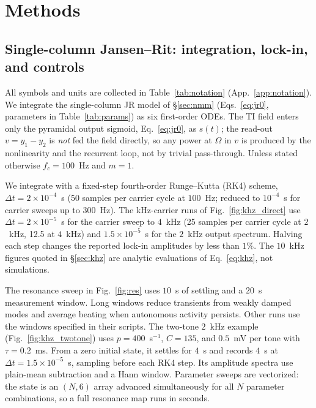 \documentclass[11pt,a4paper]{article}
\begin{document}

\section{Methods}

\subsection{Single-column Jansen--Rit: integration, lock-in, and controls}
All symbols and units are collected in Table~\ref{tab:notation}
(App.~\ref{app:notation}). We integrate the single-column JR model of \S\ref{sec:nmm}
(Eqs.~\eqref{eq:jr0}, parameters in Table~\ref{tab:params}) as six first-order
ODEs. The TI field enters only the pyramidal output sigmoid, Eq.~\eqref{eq:jr0},
as $s(t)$; the read-out $v=y_1-y_2$ is \emph{not} fed the field directly, so any
power at $\Omega$ in $v$ is produced by the nonlinearity and the recurrent loop,
not by trivial pass-through. Unless stated otherwise $f_c=100$~Hz and $m=1$.

We integrate with a fixed-step fourth-order Runge--Kutta (RK4) scheme,
$\Delta t=2\times10^{-4}$~s (50 samples per carrier cycle at $100$~Hz; reduced to
$10^{-4}$~s for carrier sweeps up to $300$~Hz). The kHz-carrier runs of
Fig.~\ref{fig:khz_direct} use $\Delta t=2\times10^{-5}$~s for the carrier sweep to
$4$~kHz (25 samples per carrier cycle at $2$~kHz, 12.5 at $4$~kHz) and
$1.5\times10^{-5}$~s for the $2$~kHz output spectrum. Halving each step changes the
reported lock-in amplitudes by less than $1\%$. The $10$~kHz figures quoted in
\S\ref{sec:khz} are analytic evaluations of Eq.~\eqref{eq:khz}, not simulations.

The resonance sweep in Fig.~\ref{fig:res} uses $10$~s of settling and a $20$~s
measurement window. Long windows reduce transients from weakly damped modes and
average beating when autonomous activity persists. Other runs use the windows
specified in their scripts.
The two-tone $2$~kHz example (Fig.~\ref{fig:khz_twotone}) uses $p=400$~s$^{-1}$,
$C=135$, and $0.5$~mV per tone with $\tau=0.2$~ms. From a zero initial state,
it settles for $4$~s and records $4$~s at $\Delta t=1.5\times10^{-5}$~s,
sampling before each RK4 step. Its amplitude spectra use plain-mean subtraction
and a Hann window. Parameter
sweeps are vectorized: the state is an
$(N,6)$ array advanced simultaneously for all $N$ parameter combinations, so a full
resonance map runs in seconds.
\end{document}
